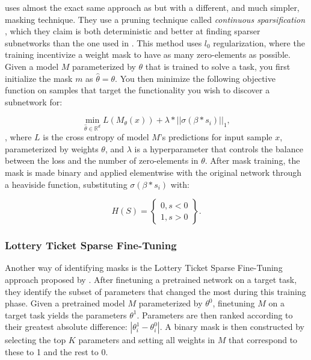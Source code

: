 \documentclass[11pt]{article}
\DeclareMathOperator*{\mini}{min}
\begin{document}
\citet{lepori2023break} uses almost the exact same approach as \citet{csordas2020neural} but with a different, and much simpler, masking technique. They use a pruning technique called \textit{continuous sparsification} \citep{savarese2020winning}, which they claim is both deterministic and better at finding sparser subnetworks than the one used in \citet{csordas2020neural}. This method uses $l_0$ regularization, where the training incentivize a weight mask to have as many zero-elements as possible. Given a model $M$ parameterized by $\theta$ that is trained to solve a task, you first initialize the mask $m$ as $\hat{\theta} = \theta$. You then minimize the following objective function on samples that target the functionality you wish to discover a subnetwork for: 

\begin{equation}
\mini_{\hat{\theta}\in \mathbb{R}^d} L\left(M_\theta(x)\right) + \lambda * ||\sigma(\beta * s_i)||_1,
\end{equation}
, where $L$ is the cross entropy of model $M$'s predictions for input sample $x$, parameterized by weights $\theta$, and $\lambda$ is a hyperparameter that controls the balance between the loss and the number of zero-elements in $\theta$. After mask training, the mask is made binary and applied elementwise with the original network through a heaviside function, substituting $\sigma(\beta * s_i)$ with:

\begin{equation}
    H(S)=
    \left\{
    \begin{array}{lr}
      0,  s < 0 \\
      1,  s > 0
    \end{array}
    \right\}.
\end{equation}

\subsubsection{Lottery Ticket Sparse Fine-Tuning}
Another way of identifying masks is the Lottery Ticket Sparse Fine-Tuning approach proposed by \citet{ansell-etal-2022-composable}. After finetuning a pretrained network on a target task, they identify the subset of parameters that changed the most during this training phase. Given a pretrained model $M$ parameterized by $\theta^0$, finetuning $M$ on a target task yields the parameters $\theta^1$. Parameters are then ranked according to their greatest absolute difference: $|\theta^1_i - \theta^0_i|$. A binary mask is then constructed by selecting the top $K$ parameters and setting all weights in $M$ that correspond to these to 1 and the rest to 0. 
\end{document}
